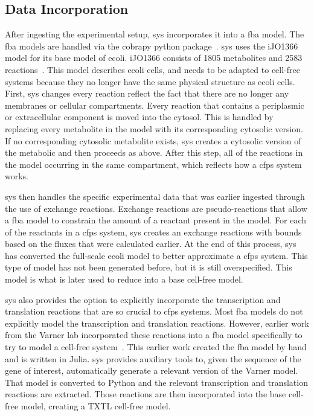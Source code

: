 \subsection{Data Incorporation} \label{sec:incorp}
After ingesting the experimental setup, \gls{sys} incorporates it into a \gls{fba} model.
The \gls{fba} models are handled via the \gls{cobra}py python package~\cite{ebrahim2013cobrapy}.
\gls{sys} uses the iJO1366 model for its base model of \gls{ecoli}.
iJO1366 consists of 1805 metabolites and 2583 reactions~\cite{orth2011comprehensive}.
This model describes \gls{ecoli} cells, and needs to be adapted to cell-free systems because they no longer have the same physical structure as \gls{ecoli} cells.
First, \gls{sys} changes every reaction reflect the fact that there are no longer any membranes or cellular compartments.
Every reaction that contains a periplasmic or extracellular component is moved into the cytosol.
This is handled by replacing every metabolite in the model with its corresponding cytosolic version.
If no corresponding cytosolic metabolite exists, \gls{sys} creates a cytosolic version of the metabolic and then proceeds as above.
After this step, all of the reactions in the model occurring in the same compartment, which reflects how a \gls{cfps} system works.

\gls{sys} then handles the specific experimental data that was earlier ingested through the use of exchange reactions.
Exchange reactions are pseudo-reactions that allow a \gls{fba} model to constrain the amount of a reactant present in the model.
For each of the reactants in a \gls{cfps} system, \gls{sys} creates an exchange reactions with bounds based on the fluxes that were calculated earlier.
At the end of this process, \gls{sys} has converted the full-scale \gls{ecoli} model to better approximate a \gls{cfps} system.
This type of model has not been generated before, but it is still overspecified.
This model is what is later used to reduce into a base cell-free model.

\gls{sys} also provides the option to explicitly incorporate the transcription and translation reactions that are so crucial to \gls{cfps} systems.
Most \gls{fba} models do not explicitly model the transcription and translation reactions.
However, earlier work from the Varner lab incorporated these reactions into a \gls{fba} model specifically to try to model a cell-free system~\cite{vilkhovoy2017sequence}.
This earlier work created the \gls{fba} model by hand and is written in Julia.
\gls{sys} provides auxiliary tools to, given the sequence of the gene of interest, automatically generate a relevant version of the Varner model.
That model is converted to Python and the relevant transcription and translation reactions are extracted.
Those reactions are then incorporated into the base cell-free model, creating a TXTL cell-free model.

